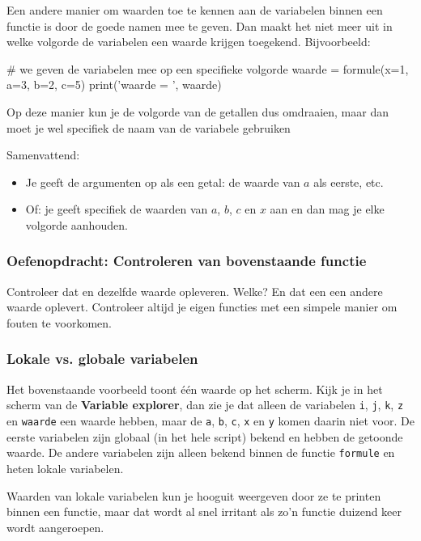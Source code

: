 \documentclass[a4paper,11pt, fleqn]{article}
\begin{document}
Een andere manier om waarden toe te kennen aan de variabelen binnen een functie is door de goede namen mee te geven. Dan maakt het niet meer uit in welke volgorde de variabelen een waarde krijgen toegekend. Bijvoorbeeld:

\begin{python}
# we geven de variabelen mee op een specifieke volgorde
waarde = formule(x=1, a=3, b=2, c=5) 
print('waarde = ', waarde)
\end{python}

Op deze manier kun je de volgorde van de getallen dus omdraaien, maar dan moet je wel specifiek de naam van de variabele gebruiken

Samenvattend:
\begin{itemize}
\item Je geeft de argumenten op als een getal: de waarde van $a$ als eerste, etc.
\item Of: je geeft specifiek de waarden van $a$, $b$, $c$ en $x$ aan en dan mag je elke volgorde aanhouden.
\end{itemize}

\subsubsection*{Oefenopdracht: Controleren van bovenstaande functie}
Controleer dat  en   dezelfde waarde opleveren. Welke? En dat een  een andere waarde oplevert. Controleer altijd je eigen functies met een simpele manier om fouten te voorkomen.

\subsubsection{Lokale vs. globale variabelen}
Het bovenstaande voorbeeld toont \'e\'en waarde op het scherm. Kijk je in het scherm van de \textbf{Variable explorer}, dan zie je dat alleen de variabelen \verb.i., \verb.j., \verb.k., \verb.z. en \verb.waarde. een waarde hebben, maar de \verb.a., \verb.b., \verb.c., \verb.x. en \verb.y. komen daarin niet voor.
De eerste variabelen zijn globaal (in het hele script) bekend en hebben de getoonde waarde. De andere variabelen zijn alleen bekend binnen de functie \verb.formule. en heten lokale variabelen. 

Waarden van lokale variabelen kun je hooguit weergeven door ze te printen binnen een functie, maar dat wordt al snel irritant als zo'n functie duizend keer wordt aangeroepen. 
\end{document}
